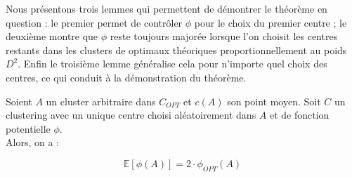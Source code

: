 \documentclass[12pt,a4paper]{book}
\newcommand{\E}{\mathbb{E}}
\newcommand{\1}{\mathds{1}}
\begin{document}
Nous présentons trois lemmes qui permettent de démontrer le théorème en question : le premier permet de contrôler $\phi$ pour le choix du premier centre ; le deuxième montre que $\phi$ reste toujours majorée lorsque l'on choisit les centres restants dans les clusters de optimaux théoriques proportionnellement au poids $D^2$. Enfin le troisième lemme généralise cela pour n'importe quel choix des centres, ce qui conduit à la démonstration du théorème.

	\begin{env_lemme}\label{lemme3.1}
		Soient $A$ un cluster arbitraire dans $C_{OPT}$ et $c(A)$ son point moyen. Soit $C$ un clustering avec un unique centre choisi aléatoirement dans $A$ et de fonction potentielle $\phi$.\\
		Alors, on a :
		
		$$
			\E\left[\phi(A)\right] = 2 \cdot \phi_{OPT} \left( A \right)
		$$		
	\end{env_lemme}	
	
\end{document}
